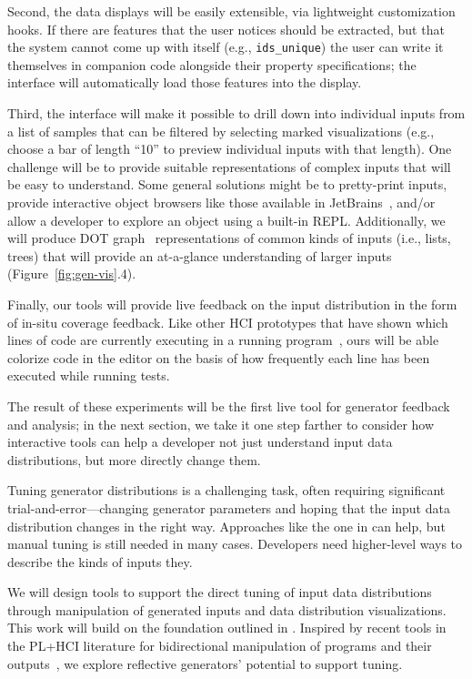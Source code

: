 Second, the data displays will be easily extensible, via lightweight customization hooks. If
there are features that the user notices should be extracted, but that the
system cannot come up with itself (e.g., \lstinline{ids_unique}) the user can
write it themselves in companion code alongside their property specifications;
the interface will automatically load those features into the display.

Third, the interface will make it possible to drill down into
individual inputs from a list of samples that can be
filtered by selecting marked visualizations (e.g., choose a bar
of length ``10'' to preview individual inputs with that length). One
challenge will be to provide suitable representations of complex inputs that
will be easy to understand. Some general solutions might be to
pretty-print inputs, provide interactive object browsers like those available
in JetBrains~\cite{tool:jetbrains}, and/or allow a developer to explore an
object using a built-in REPL. Additionally, we will produce DOT
graph~\cite{ellson_graphviz_2002} representations of common kinds of inputs
(i.e., lists, trees) that will provide an at-a-glance understanding of
larger inputs (Figure~\ref{fig:gen-vis}.4).

Finally, our tools will provide live feedback on the input
distribution in the form of in-situ coverage feedback. Like other HCI
prototypes that have shown which lines of code are currently
executing in a running program~\cite{ref:brandt2010rehearse,
  ref:oney2009firecrystal, ref:burg2013record}, ours will be
able colorize code in the editor on the basis of
how frequently each line has been executed while running tests.

The result of these experiments will be the first live tool for generator
feedback and analysis; in the next section, we take it one step
farther to consider how interactive tools can help a developer not
just understand input data distributions, but more directly change
them.

%
Tuning generator distributions is a challenging task, often requiring
significant trial-and-error---changing generator parameters and hoping
that the input data distribution changes in the right way. Approaches
like the one in  can help, but manual tuning
is still needed in many cases.
Developers need higher-level ways to describe the kinds of inputs they.

We will design tools to support the direct tuning of input data distributions
through manipulation of generated inputs and data distribution
visualizations. This work will build on the foundation outlined in
. Inspired by recent tools in
the PL+HCI literature
for bidirectional manipulation of programs and their
outputs~\cite{ref:hempel2019sketch, ref:kery2020mage,
  ref:omar2012active, ref:omar2021filling},
we explore reflective generators' potential to support tuning.

